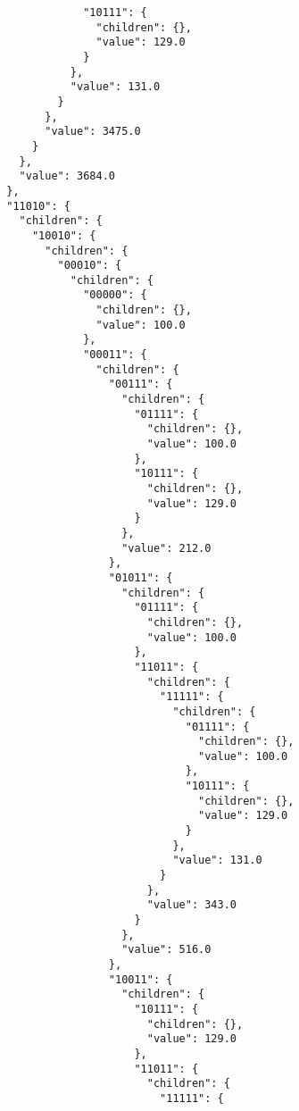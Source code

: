 \documentclass{article}
\begin{document}
\begin{listing}
\begin{verbatim}
                    "10111": {
                      "children": {},
                      "value": 129.0
                    }
                  },
                  "value": 131.0
                }
              },
              "value": 3475.0
            }
          },
          "value": 3684.0
        },
        "11010": {
          "children": {
            "10010": {
              "children": {
                "00010": {
                  "children": {
                    "00000": {
                      "children": {},
                      "value": 100.0
                    },
                    "00011": {
                      "children": {
                        "00111": {
                          "children": {
                            "01111": {
                              "children": {},
                              "value": 100.0
                            },
                            "10111": {
                              "children": {},
                              "value": 129.0
                            }
                          },
                          "value": 212.0
                        },
                        "01011": {
                          "children": {
                            "01111": {
                              "children": {},
                              "value": 100.0
                            },
                            "11011": {
                              "children": {
                                "11111": {
                                  "children": {
                                    "01111": {
                                      "children": {},
                                      "value": 100.0
                                    },
                                    "10111": {
                                      "children": {},
                                      "value": 129.0
                                    }
                                  },
                                  "value": 131.0
                                }
                              },
                              "value": 343.0
                            }
                          },
                          "value": 516.0
                        },
                        "10011": {
                          "children": {
                            "10111": {
                              "children": {},
                              "value": 129.0
                            },
                            "11011": {
                              "children": {
                                "11111": {

\end{verbatim}
\end{listing}
\end{document}

